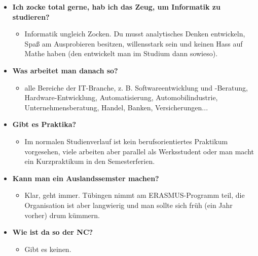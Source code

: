 \begin{large}
\begin{itemize}
	

		\item \textbf{Ich zocke total gerne, hab ich das Zeug, um Informatik zu studieren?}
		\begin{itemize}
			\item Informatik ungleich Zocken. Du musst analytisches Denken entwickeln, Spaß am Ausprobieren besitzen, willensstark sein und keinen Hass auf Mathe haben (den entwickelt man im Studium dann sowieso).
		\end{itemize}

	

		\item \textbf{Was arbeitet man danach so?}
		\begin{itemize}
			\item alle Bereiche der IT-Branche, z. B. Softwareentwicklung und -Beratung, Hardware-Entwicklung, Automatisierung, Automobilindustrie, Unternehmensberatung, Handel, Banken, Versicherungen...
		\end{itemize}

	

		\item \textbf{Gibt es Praktika?}
		\begin{itemize}
			\item Im normalen Studienverlauf ist kein berufsorientiertes Praktikum vorgesehen, viele arbeiten aber parallel als Werksstudent oder man macht ein Kurzpraktikum in den Semesterferien.
		\end{itemize}



		\item \textbf{Kann man ein Auslandssemster machen?}
		\begin{itemize}
			\item  Klar, geht immer. Tübingen nimmt am ERASMUS-Programm teil, die Organisation ist aber langwierig und man sollte sich früh (ein Jahr vorher) drum kümmern.
		\end{itemize}



		\item \textbf{Wie ist da so der NC?}
		\begin{itemize}
			\item Gibt es keinen.
		\end{itemize}
\end{itemize}
\end{large}